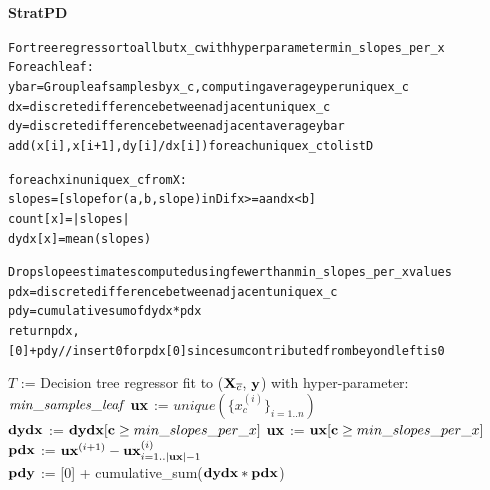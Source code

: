 \documentclass{article}
\newcommand{\xnc}{${\bf X}_{\overline{c}}$}
\begin{document}
{\bf StratPD}\begin{alltt}\small
For tree regressor to all but x_c with hyper parameter min_slopes_per_x
For each leaf:
    y bar = Group leaf samples by x_c, computing average y per unique x_c
    dx = discrete difference between adjacent unique x_c
    dy = discrete difference between adjacent average y bar
    add (x[i], x[i+1], dy[i]/dx[i]) for each unique x_c to list D

for each x in unique x_c from X:
    slopes = [slope for (a, b, slope) in D if x >= a and x < b]
    count[x] = |slopes|
    dydx[x] = mean(slopes)

Drop slope estimates computed using fewer than min_slopes_per_x values
pdx = discrete difference between adjacent unique x_c
pdy = cumulative sum of dydx * pdx
return pdx, [0]+pdy  // insert 0 for pdx[0] since sum contributed from beyond left is 0
\end{alltt}

\setlength{\algomargin}{5pt}
\begin{algorithm}[]
\DontPrintSemicolon
{}
\SetAlgoSkip{}
$T$ := Decision tree regressor fit to (\xnc{}, $\bf y$) with hyper-parameter: ${\it min\_samples\_leaf}$\;
$\bf ux$ := $unique(\{x_c^{(i)}\}_{i=1..n})$\\
${\bf dydx}$ := ${\bf dydx}[{\bf c} \ge min\_slopes\_per\_x]$
${\bf ux}$ := ${\bf ux}[{\bf c} \ge min\_slopes\_per\_x]$\\
$\bf pdx$ := ${\bf ux}^{(i+1)} - {\bf ux}^{(i)}_{i=1..|{\bf ux}|-1}$\\
$\bf pdy$ := [0] + cumulative\_sum(${\bf dydx} * \bf pdx$)~~~
\label{alg:CatStratPD}
\end{algorithm}
\end{document}
